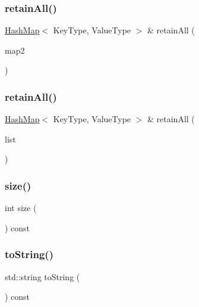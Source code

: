 \subsubsection{\texorpdfstring{retain\+All()}{retainAll()}\hspace{0.1cm}{\footnotesize\ttfamily [1/2]}}
{\footnotesize\ttfamily \mbox{\hyperlink{classHashMap}{Hash\+Map}}$<$ Key\+Type, Value\+Type $>$ \& retain\+All (\begin{DoxyParamCaption}\item[{const \mbox{\hyperlink{classHashMap}{Hash\+Map}}$<$ Key\+Type, Value\+Type $>$ \&}]{map2 }\end{DoxyParamCaption})}

\mbox{\label{classHashMap_a92e47dca61d60d4641b73848717771f5}} 
\subsubsection{\texorpdfstring{retain\+All()}{retainAll()}\hspace{0.1cm}{\footnotesize\ttfamily [2/2]}}
{\footnotesize\ttfamily \mbox{\hyperlink{classHashMap}{Hash\+Map}}$<$ Key\+Type, Value\+Type $>$ \& retain\+All (\begin{DoxyParamCaption}\item[{std\+::initializer\+\_\+list$<$ std\+::pair$<$ Key\+Type, Value\+Type $>$ $>$}]{list }\end{DoxyParamCaption})}

\mbox{\label{classHashMap_af9593d4a5ff4274efaf429cb4f9e57cc}} 
\subsubsection{\texorpdfstring{size()}{size()}}
{\footnotesize\ttfamily int size (\begin{DoxyParamCaption}{ }\end{DoxyParamCaption}) const}

\mbox{\label{classHashMap_a1fe5121d6528fdea3f243321b3fa3a49}} 
\subsubsection{\texorpdfstring{to\+String()}{toString()}}
{\footnotesize\ttfamily std\+::string to\+String (\begin{DoxyParamCaption}{ }\end{DoxyParamCaption}) const}

